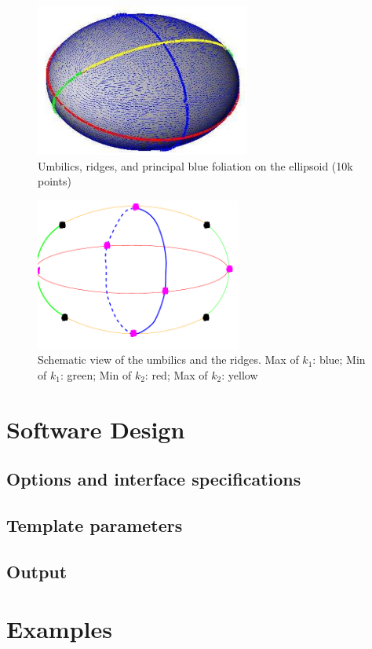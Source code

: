 \begin{minipage}[c]{.45\linewidth}
\begin{figure}[H] 
\centerline{ 
\includegraphics[height=5cm]{Ridges_3/ellipsoid_ridges_mesh}}
\caption{Umbilics, ridges, and principal blue foliation on the
ellipsoid (10k points)}
\label{pict:ellipsoid_ridges} 
\end{figure} 
\end{minipage}
\hfill
\begin{minipage}[c]{.45\linewidth}
\begin{figure}[H] 
\centerline{ 
\includegraphics[height=5cm]{Ridges_3/ellipsoid_ridges}}
\caption{Schematic view of the umbilics and the ridges. Max of $k_1$:
blue; Min of $k_1$: green; Min of $k_2$: red; Max of $k_2$: yellow}
\label{fig:ridges_ellipsoid}
\end{figure} 
\end{minipage}



\section{Software Design}


\subsection{Options and interface specifications}

\subsection{Template parameters}

\subsection{Output}



\section{Examples} 
